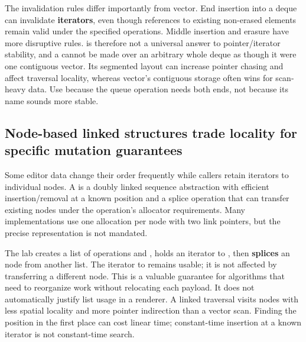 The invalidation rules differ importantly from vector. End insertion into a deque can invalidate \textbf{iterators}, even though references to existing non-erased elements remain valid under the specified operations. Middle insertion and erasure have more disruptive rules.  is therefore not a universal answer to pointer/iterator stability, and a  cannot be made over an arbitrary whole deque as though it were one contiguous vector. Its segmented layout can increase pointer chasing and affect traversal locality, whereas vector's contiguous storage often wins for scan-heavy data. Use  because the queue operation needs both ends, not because its name sounds more stable.

\subsection{Node-based linked structures trade locality for specific mutation guarantees}\label{05-engine-i-ch005-node-based-linked-structures-trade-locality-for-specific-mutation-guarantees}

\hypertarget{05-engine-i-ch005-node-based-linked-structures-trade-locality-for-specific-mutation-guarantees}{}

Some editor data change their order frequently while callers retain iterators to individual nodes. A  is a doubly linked sequence abstraction with efficient insertion/removal at a known position and a splice operation that can transfer existing nodes under the operation's allocator requirements. Many implementations use one allocation per node with two link pointers, but the precise representation is not mandated.

The lab creates a list of operations  and , holds an iterator to , then \textbf{splices} an  node from another list. The iterator to  remains usable; it is not affected by transferring a different node. This is a valuable guarantee for algorithms that need to reorganize work without relocating each payload. It does not automatically justify list usage in a renderer. A linked traversal visits nodes with less spatial locality and more pointer indirection than a vector scan. Finding the position in the first place can cost linear time; constant-time insertion at a known iterator is not constant-time search.

